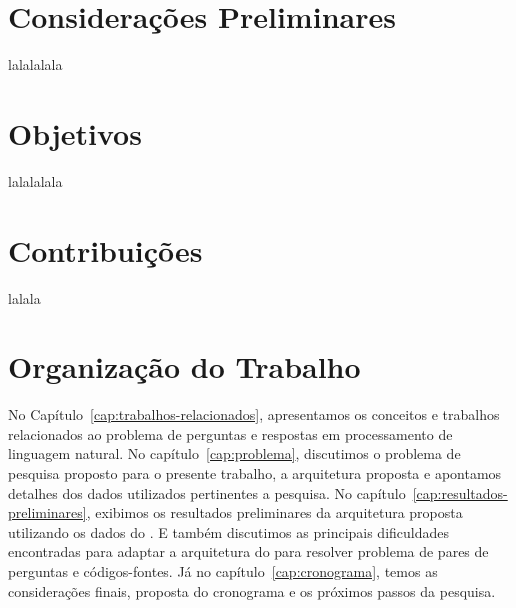 \section{Considerações Preliminares}
\label{sec:consideracoes_preliminares}

lalalalala


\section{Objetivos}
\label{sec:objetivo}

lalalalala

\section{Contribuições}
\label{sec:contribucoes}

lalala

\section{Organização do Trabalho}
\label{sec:organizacao_trabalho}

No Capítulo~\ref{cap:trabalhos-relacionados}, apresentamos os conceitos e trabalhos relacionados ao problema de perguntas e respostas em processamento de linguagem natural. No capítulo~\ref{cap:problema}, discutimos o problema de pesquisa proposto para o presente trabalho, a arquitetura proposta e apontamos detalhes dos dados utilizados pertinentes a pesquisa. 
No capítulo~\ref{cap:resultados-preliminares}, exibimos os resultados preliminares da arquitetura proposta utilizando os dados do \cite{yao-2018}. E também discutimos as principais dificuldades encontradas para adaptar a arquitetura do \cite{feng-2015} para resolver problema de pares de perguntas e códigos-fontes. Já no capítulo~\ref{cap:cronograma}, temos as considerações finais, proposta do cronograma e os próximos passos da pesquisa.
